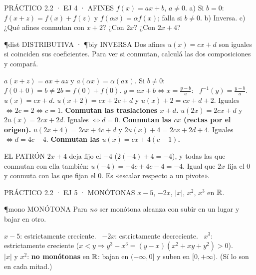 \begin{enunciado}{PRÁCTICO 2.2 · EJ 4 · AFINES}
$f(x)=ax+b$, $a\neq0$. a) Si $b=0$: $f(x+z)=f(x)+f(z)$ y $f(\alpha x)=\alpha f(x)$; falla si $b\neq0$. b) Inversa. c) ¿Qué afines conmutan con $x+2$? ¿Con $2x$? ¿Con $2x+4$?
\end{enunciado}
\begin{uso}{\P{dist} DISTRIBUTIVA · \P{biy} INVERSA}
Dos afines $u(x)=cx+d$ son iguales si coinciden sus coeficientes. Para ver si conmutan, calculá las dos composiciones y compará.
\end{uso}
$a(x+z)=ax+az$ y $a(\alpha x)=\alpha(ax)$. Si $b\neq0$: $f(0+0)=b\neq2b=f(0)+f(0)$.
$y=ax+b\iff x=\frac{y-b}a$: \ $f^{-1}(y)=\frac{y-b}a$.
$u(x)=cx+d$. $u(x+2)=cx+2c+d$ y $u(x)+2=cx+d+2$. Iguales $\iff2c=2\iff c=1$. \textbf{Conmutan las traslaciones $x+d$.}
$u(2x)=2cx+d$ y $2u(x)=2cx+2d$. Iguales $\iff d=0$. \textbf{Conmutan las $cx$ (rectas por el origen).}
$u(2x+4)=2cx+4c+d$ y $2u(x)+4=2cx+2d+4$. Iguales $\iff d=4c-4$. \textbf{Conmutan las $u(x)=cx+4(c-1)$.}
\begin{tip}{EL PATRÓN}
$2x+4$ deja fijo el $-4$ ($2(-4)+4=-4$), y todas las que conmutan con ella también: $u(-4)=-4c+4c-4=-4$. Igual que $2x$ fija el $0$ y conmuta con las que fijan el 0. Es «escalar respecto a un pivote».
\end{tip}

\begin{enunciado}{PRÁCTICO 2.2 · EJ 5 · MONÓTONAS}
$x-5$, $-2x$, $|x|$, $x^2$, $x^3$ en $\mathbb{R}$.
\end{enunciado}
\begin{uso}{\P{mono} MONÓTONA}
Para \emph{no} ser monótona alcanza con subir en un lugar y bajar en otro.
\end{uso}
$x-5$: estrictamente creciente. \ $-2x$: estrictamente decreciente. \ $x^3$: estrictamente creciente ($x<y\Rightarrow y^3-x^3=(y-x)(x^2+xy+y^2)>0$).\\
$|x|$ y $x^2$: \textbf{no monótonas} en $\mathbb{R}$: bajan en $(-\infty,0]$ y suben en $[0,+\infty)$. (Sí lo son en cada mitad.)

